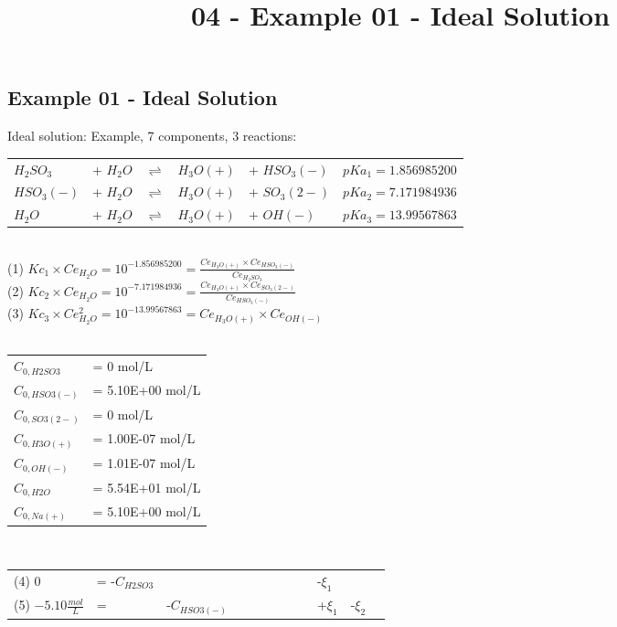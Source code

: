 \documentclass[onecolumn]{article}
\begin{document}
\begin{landscape}
\title{04 - Example 01 - Ideal Solution}
\author{}
\date{}
\maketitle
\section{Example 01 - Ideal Solution} %
Ideal solution:
Example, 7 components, 3 reactions: \\
\begin{tabular}{llcll|l}
\hline
$H_2SO_3$ & + $H_2O$ & $\rightleftharpoons$ & $H_3O(+)$ & + $HSO_3(-)$ & $pKa_1=1.856985200$ \\
$HSO_3(-)$ & + $H_2O$ & $\rightleftharpoons$ & $H_3O(+)$ & + $SO_3(2-)$ & $pKa_2=7.171984936$ \\
$H_2O$ & + $H_2O$ & $\rightleftharpoons$ & $H_3O(+)$ & + $OH(-)$ & $pKa_3=13.99567863$\\
\hline
\end{tabular}
\\
(1) $Kc_1 \times Ce_{H_2O} = 10^{-1.856985200} = \frac{Ce_{H_3O(+)} \times Ce_{HSO_3(-)}}{Ce_{H_2SO_3}}$
\\
(2) $Kc_2 \times Ce_{H_2O} = 10^{-7.171984936} = \frac{Ce_{H_3O(+)} \times Ce_{SO_3(2-)}}{Ce_{HSO_3(-)}}$
\\
(3) $Kc_3 \times Ce_{H_2O}^2 = 10^{-13.99567863} = Ce_{H_3O(+)} \times Ce_{OH(-)}$\\
\\
\begin{tabular}{ll}
\hline
$C_{0,H2SO3}$ & = 0 mol/L\\
$C_{0,HSO3(-)}$ & = 5.10E+00 mol/L \\
$C_{0,SO3(2-)}$ & = 0 mol/L \\
$C_{0,H3O(+)}$ & = 1.00E-07 mol/L \\
$C_{0,OH(-)}$ & = 1.01E-07 mol/L \\
$C_{0,H2O}$ & = 5.54E+01 mol/L \\
$C_{0,Na(+)}$ & = 5.10E+00 mol/L \\
\hline
\end{tabular}
\\
\begin{tabular}{llllllllllll}
(4) 0 &= -$C_{H2SO3}$  &  &  &  &  &  &  &  & -$\xi_1$ & & \\
(5) $-5.10\frac{mol}{L}$ &=  & -$C_{HSO3(-)}$  &  &  &  &  &  &  & +$\xi_1$ & -$\xi_2$ &  \\

\end{tabular}
\end{landscape}
\end{document}
